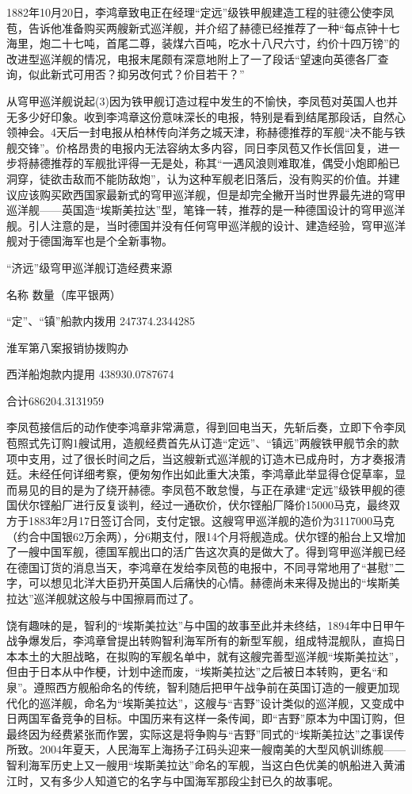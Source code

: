 \documentclass[12pt,UTF8]{ctexbook}
\begin{document}
1882年10月20日，李鸿章致电正在经理“定远”级铁甲舰建造工程的驻德公使李凤苞，告诉他准备购买两艘新式巡洋舰，并介绍了赫德已经推荐了一种“每点钟十七海里，炮二十七吨，首尾二尊，装煤六百吨，吃水十八尺六寸，约价十四万镑”的改进型巡洋舰的情况，电报末尾颇有深意地附上了一了段话“望速向英德各厂查询，似此新式可用否？抑另改何式？价目若干？”

从穹甲巡洋舰说起(3)因为铁甲舰订造过程中发生的不愉快，李凤苞对英国人也并无多少好印象。收到李鸿章这份意味深长的电报，特别是看到结尾那段话，自然心领神会。4天后一封电报从柏林传向洋务之城天津，称赫德推荐的军舰“决不能与铁舰交锋”。价格昂贵的电报内无法容纳太多内容，同日李凤苞又作长信回复，进一步将赫德推荐的军舰批评得一无是处，称其“一遇风浪则难取准，偶受小炮即船已洞穿，徒欲击敌而不能防敌炮”，认为这种军舰老旧落后，没有购买的价值。并建议应该购买欧西国家最新式的穹甲巡洋舰，但是却完全撇开当时世界最先进的穹甲巡洋舰——英国造“埃斯美拉达”型，笔锋一转，推荐的是一种德国设计的穹甲巡洋舰。引人注意的是，当时德国并没有任何穹甲巡洋舰的设计、建造经验，穹甲巡洋舰对于德国海军也是个全新事物。

“济远”级穹甲巡洋舰订造经费来源

名称 数量（库平银两）

“定”、“镇”船款内拨用 247374.2344285

淮军第八案报销协拨购办

西洋船炮款内提用 438930.0787674

合计686204.3131959

李凤苞接信后的动作使李鸿章非常满意，得到回电当天，先斩后奏，立即下令李凤苞照式先订购1艘试用，造舰经费首先从订造“定远”、“镇远”两艘铁甲舰节余的款项中支用，过了很长时间之后，当这艘新式巡洋舰的订造木已成舟时，方才奏报清廷。未经任何详细考察，便匆匆作出如此重大决策，李鸿章此举显得仓促草率，显而易见的目的是为了绕开赫德。李凤苞不敢怠慢，与正在承建“定远”级铁甲舰的德国伏尔铿船厂进行反复谈判，经过一通砍价，伏尔铿船厂降价15000马克，最终双方于1883年2月17日签订合同，支付定银。这艘穹甲巡洋舰的造价为3117000马克（约合中国银62万余两），分6期支付，限14个月将舰造成。伏尔铿的船台上又增加了一艘中国军舰，德国军舰出口的活广告这次真的是做大了。得到穹甲巡洋舰已经在德国订货的消息当天，李鸿章在发给李凤苞的电报中，不同寻常地用了“甚慰”二字，可以想见北洋大臣扔开英国人后痛快的心情。赫德尚未来得及抛出的“埃斯美拉达”巡洋舰就这般与中国擦肩而过了。

饶有趣味的是，智利的“埃斯美拉达”与中国的故事至此并未终结，1894年中日甲午战争爆发后，李鸿章曾提出转购智利海军所有的新型军舰，组成特混舰队，直捣日本本土的大胆战略，在拟购的军舰名单中，就有这艘完善型巡洋舰“埃斯美拉达”，但由于日本从中作梗，计划中途而废，“埃斯美拉达”之后被日本转购，更名“和泉”。遵照西方舰船命名的传统，智利随后把甲午战争前在英国订造的一艘更加现代化的巡洋舰，命名为“埃斯美拉达”，这艘与“吉野”设计类似的巡洋舰，又变成中日两国军备竞争的目标。中国历来有这样一条传闻，即“吉野”原本为中国订购，但最终因为经费紧张而作罢，实际这是将争购与“吉野”同式的“埃斯美拉达”之事误传所致。2004年夏天，人民海军上海扬子江码头迎来一艘南美的大型风帆训练舰——智利海军历史上又一艘用“埃斯美拉达”命名的军舰，当这白色优美的帆船进入黄浦江时，又有多少人知道它的名字与中国海军那段尘封已久的故事呢。
\end{document}
